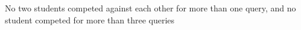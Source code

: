 No two students competed against each other for more
  than one query, and no student competed for more than three
  queries


  
